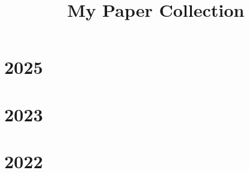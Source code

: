 \documentclass[12pt]{article}
\newcommand{\printpaperbib}[1]{%
  \begin{refsection} %
    \nocite{#1}  %
    \printbibliography[heading=none]  %
  \end{refsection}
}
\begin{document}
\title{\Large My Paper Collection}
\author{}
\date{}

\maketitle
\section*{2025}
\printpaperbib{jiang2025tokenefficientlongvideounderstanding}

\section*{2023}

\printpaperbib{example2023}


\section*{2022}
\printpaperbib{another2022}
\end{document}
